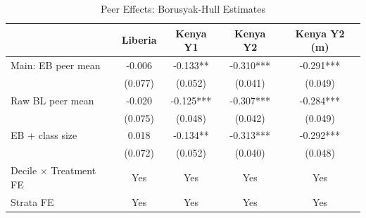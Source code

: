 \begin{table}[htbp]
\centering
\small
\caption{Peer Effects: Borusyak-Hull Estimates}
\label{tab:mechanism}
\begin{tabular}{l*{4}{c}}
\toprule
 & Liberia & Kenya Y1 & Kenya Y2 & Kenya Y2 (m) \\
\midrule
Main: EB peer mean & -0.006 & -0.133** & -0.310*** & -0.291*** \\
 & (0.077) & (0.052) & (0.041) & (0.049) \\
\addlinespace
Raw BL peer mean & -0.020 & -0.125*** & -0.307*** & -0.284*** \\
 & (0.075) & (0.048) & (0.042) & (0.049) \\
\addlinespace
EB + class size & 0.018 & -0.134** & -0.313*** & -0.292*** \\
 & (0.072) & (0.052) & (0.040) & (0.048) \\
\addlinespace
\midrule
Decile $\times$ Treatment FE & Yes & Yes & Yes & Yes \\
Strata FE & Yes & Yes & Yes & Yes \\
\bottomrule
\end{tabular}
\end{table}